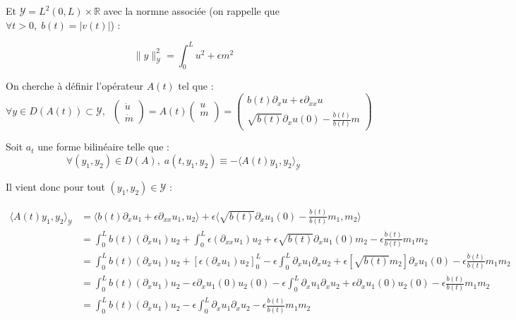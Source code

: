 \documentclass[a4paper]{article}
\newcommand{\dep}{b}
\begin{document}
  Et $\mathscr{Y} = L^2(0,L)\times \mathbb{R}$ avec la normne associée 
  (on rappelle que $\forall t>0, \;  \dep (t) = |v(t)|$) :
  
  \[\| y\|_{\mathscr{Y}}^2 = \int_0^L u^2 + \epsilon m^2 \]


 On cherche à définir l'opérateur $A(t)$ tel que :
 \[ \forall y \in D(A(t)) \subset \mathscr{Y}, \; \; 
 \left( \begin{array}{c}
 \dot{u}\\
 \dot{m}
 \end{array} \right)
 = A(t) \left( \begin{array}{c}
 u\\
 m\\
 \end{array} \right) 
 = \left(\begin{array}{c}
 \dep(t) \partial_x u + \epsilon \partial_{xx} u\\
 \sqrt{\dep(t)} \partial_x u(0) - \displaystyle \frac{\dot{\dep}(t)}{\dep(t)}m
 \end{array}\right) \]
 
 Soit $a_t$ une forme bilinéaire telle que :
 \[ \forall (y_1,y_2) \in D(A), \; 
 a(t,y_1,y_2) \equiv - \langle A(t) y_1,y_2\rangle_{\mathscr{Y}} \]

 Il vient donc pour tout $(y_1,y_2) \in \mathscr{Y}$ :

 \[
 \begin{split}
 	\langle A(t) y_1,y_2\rangle_{\mathscr{Y}} 
	                   & =  \langle \dep (t) \partial_x u_1 + \epsilon \partial_{xx}u_1 ,u_2\rangle
 					  + \epsilon \langle \sqrt{\dep(t)} \partial_x u_1(0) 
					                     - \displaystyle \frac{\dot{\dep}(t)}{\dep(t)}m_1 ,m_2 \rangle \\	
                         &= \int_0^L \dep (t) (\partial_x u_1)u_2
                            + \int_0^L \epsilon (\partial_{xx} u_1)u_2
							+ \epsilon \sqrt{\dep(t)} \partial_x u_1(0)m_2 
                             - \epsilon \displaystyle \frac{\dot{\dep}(t)}{\dep(t)}m_1m_2\\
 						& =   \int_0^L \dep(t) (\partial_xu_1)u_2
 						   + [\epsilon (\partial_x u_1)u_2]_0^L 
 						  - \epsilon \int_0^L \partial_xu_1 \partial_xu_2
						+ \epsilon [\sqrt{\dep(t)}m_2]  \partial_x u_1(0)
                           - \epsilon \displaystyle \frac{\dot{\dep}(t)}{\dep(t)}m_1m_2\\
 						& = \int_0^L \dep (t) (\partial_xu_1)u_2
						   - \epsilon \partial_xu_1(0)u_2(0)
						    -  \epsilon\int_0^L \partial_xu_1 \partial_xu_2
   						+ \epsilon \partial_xu_1(0) u_2(0) 
                         - \epsilon \displaystyle \frac{\dot{\dep}(t)}{\dep(t)}m_1m_2\\
  						& = \int_0^L \dep (t) (\partial_xu_1)u_2
						 - \epsilon \int_0^L \partial_xu_1 \partial_xu_2
                          - \epsilon \displaystyle \frac{\dot{\dep}(t)}{\dep(t)}m_1m_2   
\end{split}
\]
\end{document}
